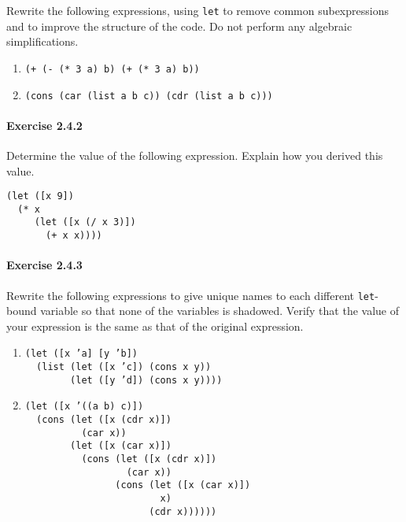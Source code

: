 \label{start_s57}Rewrite the following expressions, using \texttt{let} to remove common
subexpressions and to improve the structure of the code.
Do not perform any algebraic simplifications.


 
 \begin{enumerate}[\it a. ]
\item \texttt{(+ (- (* 3 a) b) (+ (* 3 a) b))}
\item \texttt{(cons (car (list a b c)) (cdr (list a b c)))}
\end{enumerate}




\paragraph{Exercise \label{start_g19}2.4.2}


\label{start_s58}Determine the value of the following expression.
Explain how you derived this value.


\begin{alltt}
(let ([x 9])
  (* x
     (let ([x (/ x 3)])
       (+ x x))))
\end{alltt}



\paragraph{Exercise \label{start_g20}2.4.3}


\label{start_s59}Rewrite the following expressions to give unique names to each different
\texttt{let}-bound variable so that none of the variables is shadowed.
Verify that the value of your expression is the same as that of the
original expression.


 
 \begin{enumerate}[\it a. ]
\item 
\begin{alltt}
(let ([x 'a] [y 'b])
  (list (let ([x 'c]) (cons x y))
        (let ([y 'd]) (cons x y))))
\end{alltt}

\item 
\begin{alltt}
(let ([x '((a b) c)])
  (cons (let ([x (cdr x)])
          (car x))
        (let ([x (car x)])
          (cons (let ([x (cdr x)])
                  (car x))
                (cons (let ([x (car x)])
                        x)
                      (cdr x))))))
\end{alltt}

\end{enumerate}




